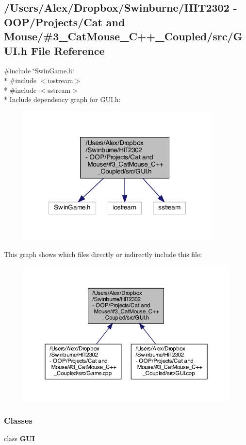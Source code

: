 \subsection{/\-Users/\-Alex/\-Dropbox/\-Swinburne/\-H\-I\-T2302 -\/ O\-O\-P/\-Projects/\-Cat and Mouse/\#3\-\_\-\-Cat\-Mouse\-\_\-\-C++\-\_\-\-Coupled/src/\-G\-U\-I.h File Reference}
\label{_g_u_i_8h}
{\ttfamily \#include \char`\"{}Swin\-Game.\-h\char`\"{}}\\*
{\ttfamily \#include $<$iostream$>$}\\*
{\ttfamily \#include $<$sstream$>$}\\*
Include dependency graph for G\-U\-I.\-h\-:
\nopagebreak
\begin{figure}[H]
\begin{center}
\leavevmode
\includegraphics[width=291pt]{_g_u_i_8h__incl}
\end{center}
\end{figure}
This graph shows which files directly or indirectly include this file\-:
\nopagebreak
\begin{figure}[H]
\begin{center}
\leavevmode
\includegraphics[width=350pt]{_g_u_i_8h__dep__incl}
\end{center}
\end{figure}
\subsubsection*{Classes}
\begin{DoxyCompactItemize}
\item 
class {\bf G\-U\-I}
\end{DoxyCompactItemize}
